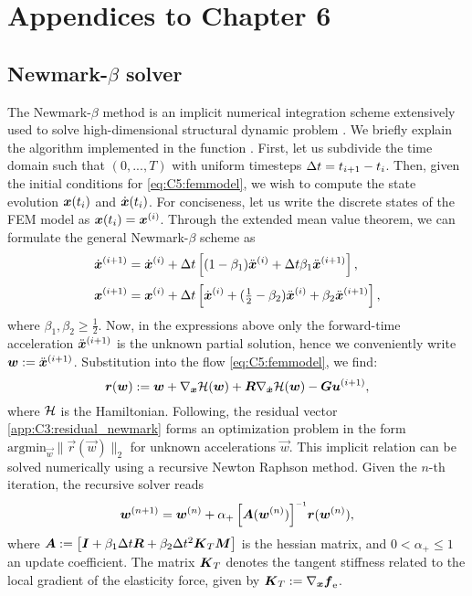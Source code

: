 \chapter{Appendices to Chapter 6}
\vspace{-10mm}
\section{Newmark-$\beta$ solver}
\label{app:C5:newmark}
The Newmark-$\beta$ method is an implicit numerical integration scheme extensively used to solve high-dimensional structural dynamic problem \cite{Newmark1959Jul,Holzapfel2002}. We briefly explain the algorithm implemented in the function . First, let us subdivide the time domain such that $(0,...,T)$ with uniform timesteps $\Delta t = t_{i+1} - t_i$. Then, given the initial conditions for \eqref{eq:C5:femmodel}, we wish to compute the state evolution ${\boldsymbol{x}}(t_i)$ and $\dot{{\boldsymbol{x}}}(t_i)$. For conciseness, let us write the discrete states of the FEM model as ${\boldsymbol{x}}(t_i) = {\boldsymbol{x}}^{(i)}$. Through the extended mean value theorem, we can formulate the general Newmark-$\beta$ scheme as
%
\begin{align}
    {\dot{\boldsymbol{x}}}^{(i+1)} & = {\dot{\boldsymbol{x}}}^{(i)} + \Delta t \left[(1-\beta_1)\ddot{\boldsymbol{x}}^{(i)} + \Delta t \beta_1 \ddot{\boldsymbol{x}}^{(i+1)} \right],                        \\[0.2em]
    {{\boldsymbol{x}}}^{(i+1)}  & = {\boldsymbol{x}}^{(i)} + \Delta t\left[ \dot{\boldsymbol{x}}^{(i)} + (\tfrac{1}{2}-\beta_2)\ddot{\boldsymbol{x}}^{(i)} + \beta_2 \ddot{\boldsymbol{x}}^{(i+1)} \right],
\end{align}
%
where $\beta_1,\beta_2 \ge \frac{1}{2}$. Now, in the expressions above only the forward-time acceleration $\ddot{\boldsymbol{x}}^{(i+1)}$ is the unknown partial solution, hence we conveniently write $\boldsymbol{w} := \ddot{{\boldsymbol{x}}}^{(i+1)}$. Substitution into the flow \eqref{eq:C5:femmodel}, we find:
%
\begin{equation}
\boldsymbol{r}(\boldsymbol{w}): = \boldsymbol{w} +\nabla_{{\boldsymbol{x}}}\mathcal{H}(\boldsymbol{w}) + \boldsymbol{R}\nabla_{\dot{{\boldsymbol{x}}}}\mathcal{H}(\boldsymbol{w}) -  \boldsymbol{G}\boldsymbol{u}^{(i+1)},
\label{app:C3:residual_newmark}
\end{equation}
%
where $\mathcal{H}$ is the Hamiltonian. Following, the residual vector \eqref{app:C3:residual_newmark} forms an optimization problem in the form $\text{argmin}_{\vec{w}} \lVert \vec{r}(\vec{w}) \rVert_2$ for unknown accelerations $\vec{w}$. This implicit relation can be solved numerically using a recursive Newton Raphson method. Given the $n$-th iteration, the recursive solver reads
%
\begin{equation}
    \vec{w}^{(n+1)} = \vec{w}^{(n)} + \alpha_+ \left[ \mat{A}(\vec{w}^{(n)}) \right]\inv\! \vec{r}(\vec{w}^{(n)}),
    \label{eq:C3:newmark_newtonsolver}
\end{equation}
%
where ${\boldsymbol{A}} := \left[{\boldsymbol{I}} + \beta_1 \Delta t {\boldsymbol{R}}  + \beta_2 \Delta t^2 \boldsymbol{K}_{T}{\boldsymbol{M}}\right]$ is the hessian matrix, and $0< \alpha_+ \le 1$ an update coefficient. The matrix $\boldsymbol{K}_T$ denotes the tangent stiffness related to the local gradient of the elasticity force, given by ${\boldsymbol{K}}_T := \nabla_{{\boldsymbol{x}}} {\boldsymbol{f}}_{\scriptstyle\textrm{e}}$.
